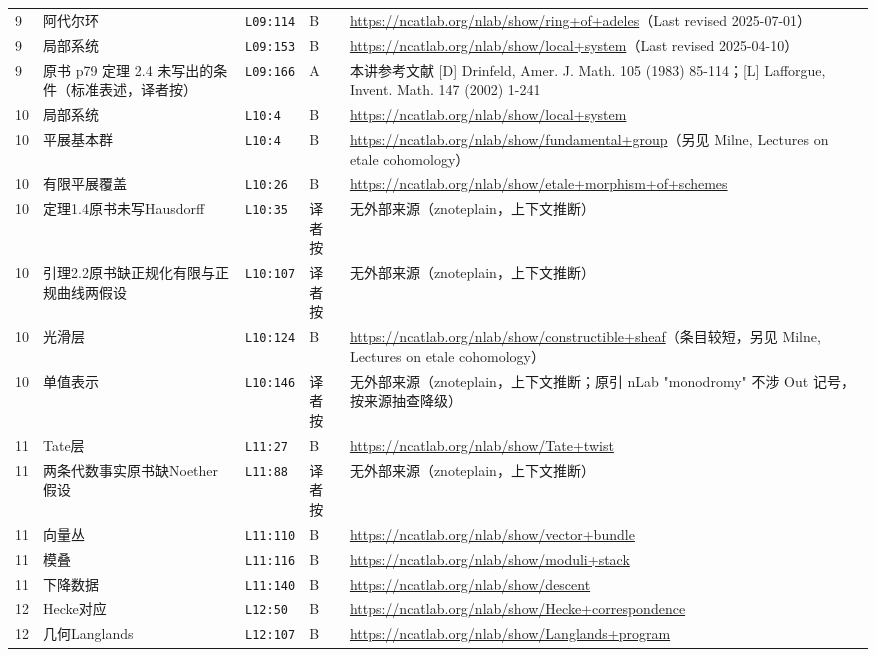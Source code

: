 \begin{longtable}{@{}p{1.0cm}p{3.3cm}p{1.5cm}p{1.3cm}p{7.9cm}@{}}
9 & 阿代尔环 & \texttt{L09:114} & B & \url{https://ncatlab.org/nlab/show/ring+of+adeles}（Last revised 2025-07-01） \\
9 & 局部系统 & \texttt{L09:153} & B & \url{https://ncatlab.org/nlab/show/local+system}（Last revised 2025-04-10） \\
9 & 原书 p79 定理 2.4 未写出的条件（标准表述，译者按） & \texttt{L09:166} & A & 本讲参考文献 [D] Drinfeld, Amer. J. Math. 105 (1983) 85-114；[L] Lafforgue, Invent. Math. 147 (2002) 1-241 \\
\midrule
10 & 局部系统 & \texttt{L10:4} & B & \url{https://ncatlab.org/nlab/show/local+system} \\
10 & 平展基本群 & \texttt{L10:4} & B & \url{https://ncatlab.org/nlab/show/fundamental+group}（另见 Milne, Lectures on etale cohomology） \\
10 & 有限平展覆盖 & \texttt{L10:26} & B & \url{https://ncatlab.org/nlab/show/etale+morphism+of+schemes} \\
10 & 定理1.4原书未写Hausdorff & \texttt{L10:35} & 译者按 & 无外部来源（znoteplain，上下文推断） \\
10 & 引理2.2原书缺正规化有限与正规曲线两假设 & \texttt{L10:107} & 译者按 & 无外部来源（znoteplain，上下文推断） \\
10 & 光滑层 & \texttt{L10:124} & B & \url{https://ncatlab.org/nlab/show/constructible+sheaf}（条目较短，另见 Milne, Lectures on etale cohomology） \\
10 & 单值表示 & \texttt{L10:146} & 译者按 & 无外部来源（znoteplain，上下文推断；原引 nLab "monodromy" 不涉 Out 记号，按来源抽查降级） \\
\midrule
11 & Tate层 & \texttt{L11:27} & B & \url{https://ncatlab.org/nlab/show/Tate+twist} \\
11 & 两条代数事实原书缺Noether假设 & \texttt{L11:88} & 译者按 & 无外部来源（znoteplain，上下文推断） \\
11 & 向量丛 & \texttt{L11:110} & B & \url{https://ncatlab.org/nlab/show/vector+bundle} \\
11 & 模叠 & \texttt{L11:116} & B & \url{https://ncatlab.org/nlab/show/moduli+stack} \\
11 & 下降数据 & \texttt{L11:140} & B & \url{https://ncatlab.org/nlab/show/descent} \\
\midrule
12 & Hecke对应 & \texttt{L12:50} & B & \url{https://ncatlab.org/nlab/show/Hecke+correspondence} \\
12 & 几何Langlands & \texttt{L12:107} & B & \url{https://ncatlab.org/nlab/show/Langlands+program} \\

\end{longtable}
